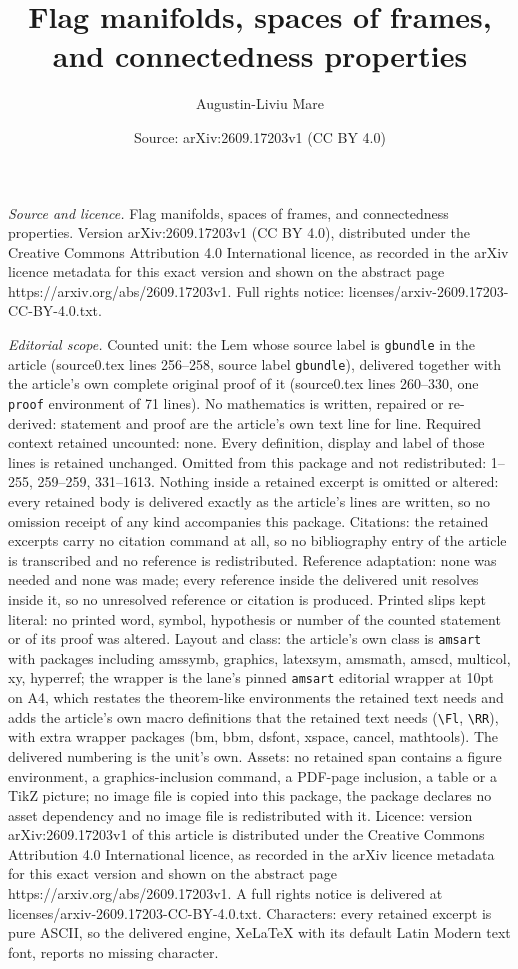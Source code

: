 \documentclass[10pt,a4paper]{amsart}
\title[Flag manifolds, spaces of frames, and connectedness properti]{Flag manifolds, spaces of frames, and connectedness properties}
\author{Augustin-Liviu Mare}
\date{Source: arXiv:2609.17203v1 (CC BY 4.0)}
\begin{document}
\maketitle

\noindent\emph{Source and licence.} Flag manifolds, spaces of frames, and connectedness properties. Version arXiv:2609.17203v1 (CC BY 4.0), distributed under the Creative Commons Attribution 4.0 International licence, as recorded in the arXiv licence metadata for this exact version and shown on the abstract page https://arxiv.org/abs/2609.17203v1. Full rights notice: licenses/arxiv-2609.17203-CC-BY-4.0.txt.\par\smallskip

\noindent\textit{Editorial scope.} Counted unit: the Lem whose source label is \texttt{gbundle} in the article (source0.tex lines 256--258, source label \texttt{gbundle}), delivered together with the article's own complete original proof of it (source0.tex lines 260--330, one \texttt{proof} environment of 71 lines). No mathematics is written, repaired or re-derived: statement and proof are the article's own text line for line. Required context retained uncounted: none. Every definition, display and label of those lines is retained unchanged. Omitted from this package and not redistributed: 1--255, 259--259, 331--1613. Nothing inside a retained excerpt is omitted or altered: every retained body is delivered exactly as the article's lines are written, so no omission receipt of any kind accompanies this package. Citations: the retained excerpts carry no citation command at all, so no bibliography entry of the article is transcribed and no reference is redistributed. Reference adaptation: none was needed and none was made; every reference inside the delivered unit resolves inside it, so no unresolved reference or citation is produced. Printed slips kept literal: no printed word, symbol, hypothesis or number of the counted statement or of its proof was altered. Layout and class: the article's own class is \texttt{amsart} with packages including amssymb, graphics, latexsym, amsmath, amscd, multicol, xy, hyperref; the wrapper is the lane's pinned \texttt{amsart} editorial wrapper at 10pt on A4, which restates the theorem-like environments the retained text needs and adds the article's own macro definitions that the retained text needs (\texttt{\textbackslash Fl}, \texttt{\textbackslash RR}), with extra wrapper packages (bm, bbm, dsfont, xspace, cancel, mathtools). The delivered numbering is the unit's own. Assets: no retained span contains a figure environment, a graphics-inclusion command, a PDF-page inclusion, a table or a TikZ picture; no image file is copied into this package, the package declares no asset dependency and no image file is redistributed with it. Licence: version arXiv:2609.17203v1 of this article is distributed under the Creative Commons Attribution 4.0 International licence, as recorded in the arXiv licence metadata for this exact version and shown on the abstract page https://arxiv.org/abs/2609.17203v1. A full rights notice is delivered at licenses/arxiv-2609.17203-CC-BY-4.0.txt. Characters: every retained excerpt is pure ASCII, so the delivered engine, XeLaTeX with its default Latin Modern text font, reports no missing character.
\end{document}
